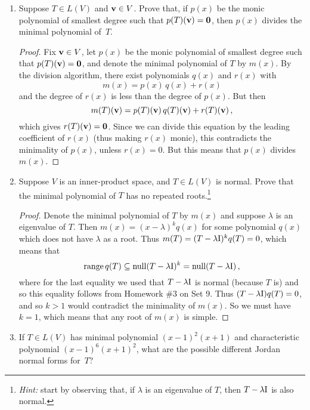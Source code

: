 \documentclass[11pt]{amsart}
\begin{document}
\begin{enumerate}[(1)]
\item Suppose $T \in L(V)$ and $\mathbf v \in V$. Prove that, if $p(x)$ be the monic polynomial of smallest degree such that $p(T) (\mathbf v) = \mathbf 0$, then $p(x)$ divides the minimal polynomial of~$T$.

\begin{proof}
Fix $\mathbf v \in V$, let $p(x)$ be the monic polynomial of smallest degree such that $p(T) (\mathbf v) = \mathbf 0$, and denote the minimal polynomial of $T$ by $m(x)$. By the division algorithm, there exist polynomials $q(x)$ and $r(x)$ with
\[
  m(x) = p(x) \, q(x) + r(x)
\]
and the degree of $r(x)$ is less than the degree of $p(x)$. But then
\[
  m(T) (\mathbf v) = p(T) (\mathbf v) \, q(T) (\mathbf v) + r(T) (\mathbf v) \, ,
\]
which gives $r(T)(\mathbf v) = \mathbf 0$. Since we can divide this equation by the leading coefficient of $r(x)$ (thus making $r(x)$ monic), this contradicts the minimality of $p(x)$, unless $r(x) = 0$. But this means that $p(x)$ divides $m(x)$.
\end{proof}

\item Suppose $V$ is an inner-product space, and $T \in L(V)$ is normal. Prove that the minimal polynomial of $T$ has no repeated roots.\footnote{\emph{Hint:} start by observing that, if $\lambda$ is an eigenvalue of $T$, then $T - \lambda \mathrm I$ is also normal.}

\begin{proof}
Denote the minimal polynomial of $T$ by $m(x)$ and suppose $\lambda$ is an eigenvalue of $T$.
Then $m(x) = (x-\lambda)^k q(x)$ for some polynomial $q(x)$ which does not have $\lambda$ as a root.
Thus $m(T) = (T - \lambda \mathrm I)^k q(T) = 0$, which means that
\[
  \operatorname{range} q(T) \subseteq \operatorname{null} (T - \lambda \mathrm I)^k = \operatorname{null} (T - \lambda \mathrm I) \, ,
\]
where for the last equality we used that $T - \lambda \mathrm I$ is normal (because $T$ is) and so this equality follows from Homework \#3 on Set 9.
Thus $(T - \lambda \mathrm I) q(T) = 0$, and so $k > 1$ would contradict the minimality of $m(x)$.
So we must have $k=1$, which means that any root of $m(x)$ is simple.
\end{proof}

\item If $T \in L(V)$ has minimal polynomial $(x-1)^2 (x+1)$ and characteristic polynomial $(x-1)^6 (x+1)^2$, what are the possible different Jordan normal forms for~$T$? 


\end{enumerate}
\end{document}
